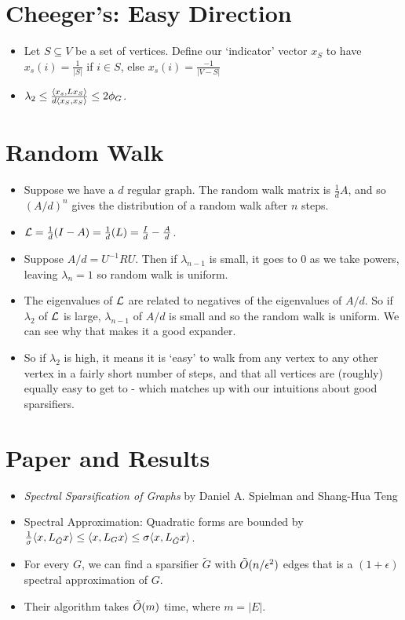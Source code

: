 \documentclass[11pt]{article}
\begin{document}
\section{Cheeger's: Easy Direction}
\label{sec:org1ffc9e2}
\begin{itemize}
\item Let \(S \subseteq V\) be a set of vertices. Define our `indicator' vector \(x_S\) to have \(x_s(i)=\frac{1}{|S|}\) if \(i \in S\), else \(x_s(i)=\frac{-1}{|V-S|}\)
\item \(\lambda_2 \le \frac{\langle x_s , Lx_S \rangle}{d\langle x_S , x_S \rangle} \le 2\phi_G\).
\end{itemize}
\section{Random Walk}
\label{sec:orga42229e}
\begin{itemize}
\item Suppose we have a \(d\) regular graph. The random walk matrix is \(\frac{1}{d}A\), and so \((A/d)^n\) gives the distribution of a random walk after \(n\) steps.
\item \(\mathcal{L}=\frac{1}{d}(I-A)=\frac{1}{d}(L)=\frac{I}{d}-\frac{A}{d}\).
\item Suppose \(A/d=U^{-1}RU\). Then if \(\lambda_{n-1}\) is small, it goes to \(0\) as we take powers, leaving \(\lambda_n=1\) so random walk is uniform.
\item The eigenvalues of \(\mathcal{L}\) are related to negatives of the eigenvalues of \(A/d\). So if \(\lambda_2\) of \(\mathcal{L}\) is large, \(\lambda_{n-1}\) of \(A/d\) is small and so the random walk is uniform. We can see why that makes it a good expander.
\item So if \(\lambda_2\) is high, it means it is `easy' to walk from any vertex to any other vertex in a fairly short number of steps, and that all vertices are (roughly) equally easy to get to - which matches up with our intuitions about good sparsifiers.
\end{itemize}
\section{Paper and Results}
\label{sec:org2be5e88}
\begin{itemize}
\item \emph{Spectral Sparsification of Graphs} by Daniel A. Spielman and Shang-Hua Teng
\item Spectral Approximation: Quadratic forms are bounded by \(\frac{1}{\sigma}\langle x , L_{\tilde{G}}x \rangle \le \langle x , L_Gx \rangle \le \sigma\langle x , L_{\tilde{G}}x \rangle\).
\item For every \(G\), we can find a sparsifier \(\tilde{G}\) with \(\tilde{O}(n/\epsilon^2)\) edges that is a \((1+\epsilon)\) spectral approximation of \(G\).
\item Their algorithm takes \(\tilde{O}(m)\) time, where \(m=|E|\).
\end{itemize}
\end{document}
